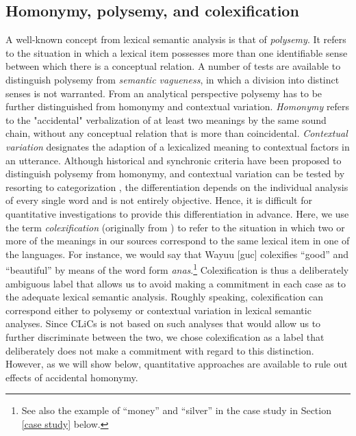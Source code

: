 \subsection{Homonymy, polysemy, and colexification}
A well-known concept from lexical semantic analysis is that of \emph{polysemy}. It refers to the situation
in which a lexical item possesses more than one identifiable sense between which there is a
conceptual relation. A number of tests are available to distinguish polysemy from \emph{semantic
vagueness}, in which a division into distinct senses is not warranted. From an analytical perspective
polysemy has to be further distinguished from {homonymy} and contextual variation.
\emph{Homonymy} refers to
the "accidental" verbalization of at least two meanings by the same sound chain, without any
conceptual relation that is more than coincidental. \emph{Contextual variation}
designates the adaption of a lexicalized meaning to contextual factors in an utterance. Although
historical and synchronic criteria have been proposed to distinguish polysemy from homonymy, and
contextual variation can be tested by resorting to categorization \cite{blank1997}, the
differentiation depends on the individual analysis of every single word and is not entirely
objective. Hence, it is difficult for quantitative investigations to provide this differentiation
in advance.
Here, we use the term \textit{colexification} (originally from ) %
to refer to the situation
in which two or more of the meanings in our sources correspond to the same lexical item in one of
the languages. For instance, we would say that Wayuu [guc] colexifies ``good'' and ``beautiful'' by means of the word form \textit{anas\textbari}.\footnote{See also the example of ``money'' and ``silver'' in the case study in Section \ref{case study} below.}
Colexification is thus a deliberately ambiguous label that allows us to avoid making a commitment in
each case as to the adequate lexical semantic analysis.
Roughly speaking,
colexification can correspond either to polysemy or contextual variation in lexical semantic analyses.
Since CLiCs is not based on such analyses that would allow us to further discriminate between the
two, we chose colexification as a label that deliberately does not make a commitment with regard to
this distinction. However, as we will show below, quantitative approaches are available to rule out effects of accidental homonymy. 

